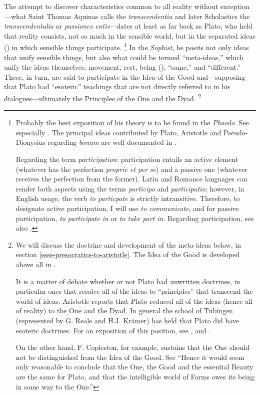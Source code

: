 The attempt to discover characteristics common to all reality without exception---what Saint Thomas Aquinas calls the \emph{transcendentia} and later Scholastics the \emph{transcendentalia} or \emph{passiones entis}---dates at least as far back as Plato, who held that reality consists, not so much in the sensible world, but in the separated ideas () in which sensible things participate.%
%
\footnote{Probably the best exposition of his theory is to be found in the \emph{Phaedo}. See especially \cite[78c--79a, and 100b--101d]{plato:phaedo}. The principal ideas contributed by Plato, Aristotle and Pseudo-Dionysius regarding \emph{bonum} are well documented in \cite[290-298]{aertsen:transcendentals}.

Regarding the term \emph{participation}: participation entails an active element (whatever has the perfection \emph{proprie et per se}) and a passive one (whatever receives the perfection from the former). Latin and Romance languages can render both aspects using the terms \emph{participo} and \emph{participatio}; however, in English usage, the verb \emph{to particpate} is strictly intransitive. Therefore, to designate active participation, I will use \emph{to communicate}, and for passive participation, \emph{to participate in} or \emph{to take part in}. Regarding participation, see also \cite[453--456]{fabro:intensive}.}
%
In the \emph{Sophist}, he posits not only ideas that unify sensible things, but also what could be termed \enquote{meta-ideas,} which unify the ideas themselves: movement, rest, being (), \enquote{same,} and \enquote{different.} These, in turn, are said to participate in the Idea of the Good and---supposing that Plato had \enquote{esoteric} teachings that are not directly referred to in his dialogues---ultimately the Principles of the One and the Dyad.%
%
\footnote{We will discuss the doctrine and development of the meta-ideas below, in section \ref{esse-presocratics-to-aristotle}. The Idea of the Good is developed above all in \cite[VI, 508c--509a]{plato:republic}. 

It is a matter of debate whether or not Plato had unwritten doctrines, in particular ones that resolve all of the ideas to ``principles'' that transcend the world of ideas. Aristotle reports that Plato reduced all of the ideas (hence all of reality) to the One and the Dyad. \parencite[See][Α, 6, 987b19-988a7.]{aristotle:metaphysics} In general the school of Tübingen (represented by G. Reale and  H.J. Krämer) has held that Plato did have esoteric doctrines. For an exposition of this position, see \cite{kramer:platone}, and \cite{reale:nuova}.

On the other hand, F. Copleston, for example, sustains that the One should not be distinguished from the Idea of the Good. See \cite[177]{copleston:history:01} ``Hence it would seem only reasonable to conclude that the One, the Good and the essential Beauty are the same for Plato, and that the intelligible world of Forms owes its being in some way to the One.''}
